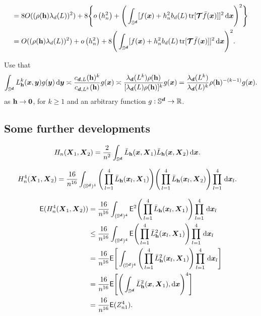 \documentclass{article}
\begin{document}
\begin{align*}
    = &\; 8 O (( \rho ( \mathbf h ) \lambda_d(L) )^2 )  + 8 \Bigg\{ o\left(h_n^2\right) + \Bigg( \int_{\mathbb{S}^{\boldsymbol{d}}} [f(\boldsymbol{x})+h_n^2 b_d(L) \operatorname{tr}[\boldsymbol{\mathcal { T }} \bar{f}(\boldsymbol{x})]]^2 \,\mathrm{d} \boldsymbol{x} \Bigg)^2 \Bigg\} \\
    = &\; O (( \rho ( \mathbf h ) \lambda_d(L) )^2 ) + o\left(h_n^2\right)  + 8 \Bigg( \int_{\mathbb{S}^{\boldsymbol{d}}} [f(\boldsymbol{x})+h_n^2 b_d(L) \operatorname{tr}[\boldsymbol{\mathcal { T }} \bar{f}(\boldsymbol{x})]]^2 \,\mathrm{d} \boldsymbol{x} \Bigg)^2.
\end{align*}

Use that
\begin{align}
    \int_{\mathbb{S}^{\boldsymbol{d}}} L_{\mathbf h}^k(\boldsymbol{x},\boldsymbol{y}) g(\boldsymbol{y})\,\mathrm{d}\boldsymbol{y}\asymp \frac{c_{\boldsymbol{d},L}(\mathbf h)^k}{c_{\boldsymbol{d},L^k}(\mathbf h)} g(\boldsymbol{x}) \asymp \frac{\lambda_{\boldsymbol{d}}(L^k)\rho(\mathbf h)}{[\lambda_{\boldsymbol{d}}(L)\rho(\mathbf h)]^k} g(\boldsymbol{x})=\frac{\lambda_{\boldsymbol{d}}(L^k)}{\lambda_{\boldsymbol{d}}(L)^k} \rho(\mathbf h)^{-(k-1)}g(\boldsymbol{x}). \label{eq:equivLh}
\end{align}
as $\mathbf h\to\mathbf{0}$, for $k\geq 1$ and an arbitrary function $g:\mathbb{S}^{\boldsymbol{d}}\to\mathbb{R}$.

\subsection{Some further developments}

\begin{align*}
    H_n(\boldsymbol{X}_1, \boldsymbol{X}_2) &= \frac{2}{n^2} \int_{\mathbb{S}^{\boldsymbol{d}}} \bar{L}_{\mathbf h} (\boldsymbol{x},\boldsymbol{X}_1) \bar{L}_{\mathbf h} (\boldsymbol{x},\boldsymbol{X}_2) \,\mathrm{d} \boldsymbol{x}.
\end{align*}

\begin{align*}
    H_n^4(\boldsymbol{X}_1, \boldsymbol{X}_2) &= \frac{16}{n^{16}} \int_{(\mathbb{S}^{\boldsymbol{d}})^4} \Bigg( \prod_{l=1}^{4} \bar{L}_{\mathbf h} (\boldsymbol{x}_l,\boldsymbol{X}_1) \Bigg) \Bigg( \prod_{l=1}^{4} \bar{L}_{\mathbf h} (\boldsymbol{x}_l,\boldsymbol{X}_2) \Bigg) \prod_{l=1}^{4} \,\mathrm{d} 
    \boldsymbol{x}_l.
\end{align*}

\begin{align*}
    \mathsf{E} (H_n^4(\boldsymbol{X}_1, \boldsymbol{X}_2)) &= \frac{16}{n^{16}} \int_{(\mathbb{S}^{\boldsymbol{d}})^4} \mathsf{E}^2 \Bigg( \prod_{l=1}^{4} \bar{L}_{\mathbf h} (\boldsymbol{x}_l,\boldsymbol{X}_1) \Bigg) \prod_{l=1}^{4} \,\mathrm{d} 
    \boldsymbol{x}_l \\
    & \le \frac{16}{n^{16}} \int_{(\mathbb{S}^{\boldsymbol{d}})^4} \mathsf{E} \Bigg( \prod_{l=1}^{4} \bar{L}_{\mathbf h}^2 (\boldsymbol{x}_l,\boldsymbol{X}_1) \Bigg) \prod_{l=1}^{4} \,\mathrm{d} \boldsymbol{x}_l \\
    &= \frac{16}{n^{16}} \mathsf{E} \Bigg[ \int_{(\mathbb{S}^{\boldsymbol{d}})^4} \Bigg( \prod_{l=1}^{4} \bar{L}_{\mathbf h}^2 (\boldsymbol{x}_l,\boldsymbol{X}_1) \Bigg) \prod_{l=1}^{4} \,\mathrm{d} \boldsymbol{x}_l \Bigg] \\
    &= \frac{16}{n^{16}} \mathsf{E} \Bigg[ \Bigg( \int_{\mathbb{S}^{\boldsymbol{d}}} \bar{L}_{\mathbf h}^2 (\boldsymbol{x},\boldsymbol{X}_1) ,\mathrm{d} \boldsymbol{x} \Bigg)^4 \Bigg] \\
    &= \frac{16}{n^{16}} \mathsf{E} (Z_{n1}^4).
\end{align*}
\end{document}
